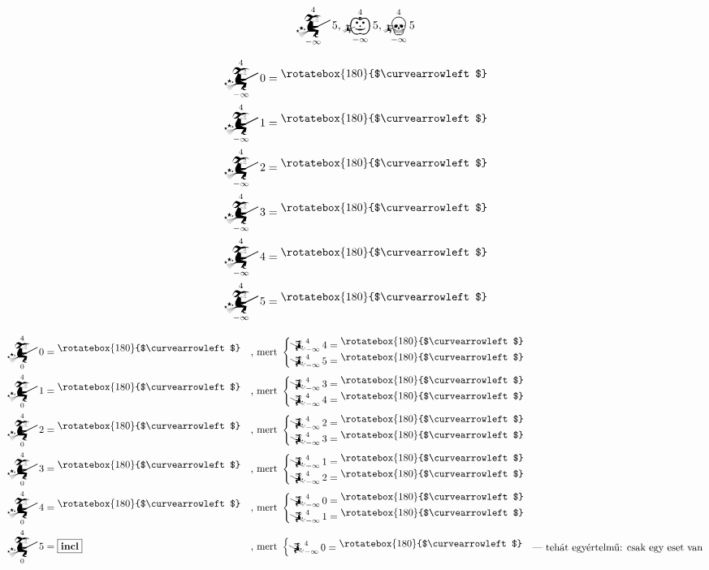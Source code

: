 \documentclass{article}
\newcommand{\nothing}{\text{\raisebox{0.4em}{\rotatebox{180}{$\curvearrowleft$}}}}%
\newcommand{\just}[1]{\boxed{#1}}%
\newcommand{\incl}{\mathbf{incl}}
\newcommand{\mainfunA}[3]{\mathwitch_{#2}^{#1}#3}
\newcommand{\mainfunB}[3]{\reversemathwitch_{#2}^{#1}#3}
\newcommand{\nomainfunA}[3]{{}_{\mathwitch}\!\!\!\!\bigskull^{#1}_{#2}#3}
\newcommand{\yesmainfunA}[3]{{}_{\mathwitch}\!\!\!\!\bigpumpkin^{#1}_{#2}#3}
\begin{document}
	\[\mainfunA4{-\infty}5, \yesmainfunA4{-\infty}5, \nomainfunA4{-\infty}5\]

	\begin{align*}
		\mainfunA4{-\infty}0 &= \nothing \\
		\mainfunA4{-\infty}1 &= \nothing \\
		\mainfunA4{-\infty}2 &= \nothing \\
		\mainfunA4{-\infty}3 &= \nothing \\
		\mainfunA4{-\infty}4 &= \nothing \\
		\mainfunA4{-\infty}5 &= \nothing
	\end{align*}

	\begin{align*}
		\mainfunA4{0}0  &= \nothing    &&\text{, mert }\begin{cases}\mainfunB4{-\infty}4 = \nothing\\\mainfunB4{-\infty}5 = \nothing&\end{cases} \\
		\mainfunA4{0}1  &= \nothing    &&\text{, mert }\begin{cases}\mainfunB4{-\infty}3 = \nothing\\\mainfunB4{-\infty}4 = \nothing&\end{cases} \\
		\mainfunA4{0}2  &= \nothing    &&\text{, mert }\begin{cases}\mainfunB4{-\infty}2 = \nothing\\\mainfunB4{-\infty}3 = \nothing&\end{cases} \\
		\mainfunA4{0}3  &= \nothing    &&\text{, mert }\begin{cases}\mainfunB4{-\infty}1 = \nothing\\\mainfunB4{-\infty}2 = \nothing&\end{cases} \\
		\mainfunA4{0}4  &= \nothing    &&\text{, mert }\begin{cases}\mainfunB4{-\infty}0 = \nothing\\\mainfunB4{-\infty}1 = \nothing&\end{cases} \\
		\mainfunA4{0}5  &= \just \incl &&\text{, mert }\begin{cases}\mainfunB4{-\infty}0 = \nothing&\text{--- tehát egyértelmű: csak egy eset van}\end{cases}
	\end{align*}
\end{document}
